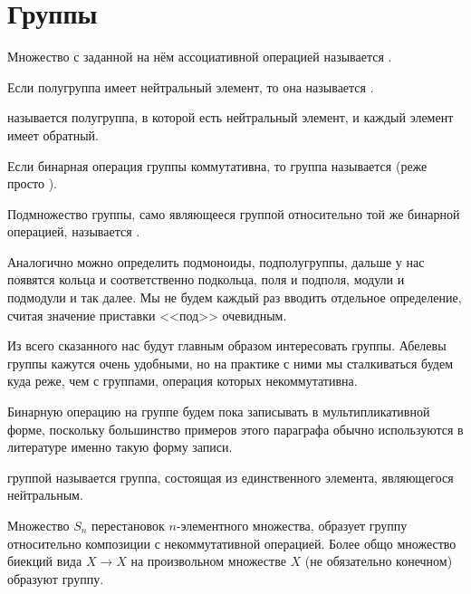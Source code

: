 \section{Группы}

\begin{definition}
	Множество с заданной на нём ассоциативной операцией называется .
\end{definition}

\begin{definition}
	Если полугруппа имеет нейтральный элемент, то она называется .
\end{definition}

\begin{definition}
	 называется полугруппа, в которой есть нейтральный элемент, и каждый элемент имеет обратный.
\end{definition}

\begin{definition}
	Если бинарная операция группы коммутативна, то группа называется  (реже просто ).
\end{definition}

\begin{definition}
	Подмножество группы, само являющееся группой относительно той же бинарной операцией, называется .
\end{definition}

Аналогично можно определить подмоноиды, подполугруппы, дальше у нас появятся кольца и соответственно подкольца, поля и подполя, модули и подмодули и так далее. Мы не будем каждый раз вводить отдельное определение, считая значение приставки <<под>> очевидным.

Из всего сказанного нас будут главным образом интересовать группы. Абелевы группы кажутся очень удобными, но на практике с ними мы сталкиваться будем куда реже, чем с группами, операция которых некоммутативна.

Бинарную операцию на группе будем пока записывать в мультипликативной форме, поскольку большинство примеров этого параграфа обычно используются в литературе именно такую форму записи.

\begin{example}
	 группой называется группа, состоящая из единственного элемента, являющегося нейтральным.
\end{example}

\begin{example}
	Множество $S_n$ перестановок $n$-элементного множества, образует группу относительно композиции с некоммутативной операцией. Более общо множество биекций вида $X\to X$ на произвольном множестве $X$ (не обязательно конечном) образуют группу.
\end{example}

